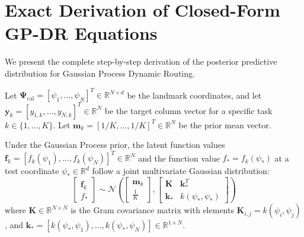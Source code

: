 \documentclass{article}
\theoremstyle{plain}
\theoremstyle{definition}
\theoremstyle{remark}
\begin{document}










\newpage
\appendix
\onecolumn

\section{Exact Derivation of Closed-Form GP-DR Equations}
\label{app:gp_derivation}

We present the complete step-by-step derivation of the posterior predictive distribution for Gaussian Process Dynamic Routing.

Let $\mathbf{\Psi}_{\text{cal}} = [\psi_1, \dots, \psi_N]^T \in \mathbb{R}^{N \times d}$ be the landmark coordinates, and let $\mathbf{y}_k = [y_{1, k}, \dots, y_{N, k}]^T \in \mathbb{R}^N$ be the target column vector for a specific task $k \in \{1, \dots, K\}$. Let $\mathbf{m}_k = [1/K, \dots, 1/K]^T \in \mathbb{R}^N$ be the prior mean vector. 

Under the Gaussian Process prior, the latent function values $\mathbf{f}_k = [f_k(\psi_1), \dots, f_k(\psi_N)]^T \in \mathbb{R}^N$ and the function value $f_* = f_k(\psi_*)$ at a test coordinate $\psi_* \in \mathbb{R}^d$ follow a joint multivariate Gaussian distribution:
\begin{equation}
\begin{bmatrix} \mathbf{f}_k \\ f_* \end{bmatrix} \sim \mathcal{N}\left( \begin{bmatrix} \mathbf{m}_k \\ \frac{1}{K} \end{bmatrix}, \begin{bmatrix} \mathbf{K} & \mathbf{k}_*^T \\ \mathbf{k}_* & k(\psi_*, \psi_*) \end{bmatrix} \right)
\end{equation}
where $\mathbf{K} \in \mathbb{R}^{N \times N}$ is the Gram covariance matrix with elements $\mathbf{K}_{i, j} = k(\psi_i, \psi_j)$, and $\mathbf{k}_* = [k(\psi_*, \psi_1), \dots, k(\psi_*, \psi_N)] \in \mathbb{R}^{1 \times N}$.
\end{document}
